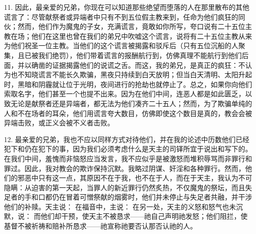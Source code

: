 11. 因此，最亲爱的兄弟，你现在可以知道那些绝望而堕落的人在那里散布的其他谎言了：尽管献祭者或异端者中只有不到五位假主教来到，任命为他们疯狂的同伙；然而，他们作为魔鬼的子女，充满谎言，竟敢如你所写，夸口说有二十五位主教在场；他们在这里也曾在我们的弟兄中吹嘘这个谎言，说将有二十五位主教从来为他们祝圣一位主教。当他们的这个谎言被揭露和驳斥后（只有五位沉船的人聚集，且已被我们绝罚），他们带着谎言的报酬航行到，仿佛真理不能航行到他们后面，并以确凿的证据揭露他们的说谎之舌。而这，我的弟兄，是真正的疯狂：不认为也不知晓谎言不能长久欺骗，黑夜只持续到白天放明；但当白天清明、太阳升起时，黑暗和阴霾就让位于光明，夜间进行的抢劫也就停止了。总之，如果你向他们索取名字，他们甚至一个也提不出来。因为在他们中间，连恶人都是如此匮乏，以致无论是献祭者还是异端者，都无法为他们凑齐二十五人；然而，为了欺骗单纯的人和不在场者的耳朵，他们用谎言夸大数目，仿佛即使这个数目是真的，教会会被异端击败，或正义会被不义者击败。\par

12. 最亲爱的兄弟，我也不应以同样方式对待他们，并在我的论述中历数他们已经犯下和仍在犯下的事，因为我们必须考虑什么是天主的司铎所宜于说出和写下的。在我们中间，羞愧而非恼怒应当发言，我不应似乎是被激怒而堆积辱骂而非罪行和罪过。因此，我对教会的欺诈保持沉默。我略过阴谋、奸淫和各种罪行。然而，他们的邪恶中只有这一点，其原因不在于我，也不在于人，而在于天主，我认为不可隐瞒：从迫害的第一天起，当罪人的新近罪行仍然炙热，不仅魔鬼的祭坛，而且失足者的手和口都仍在冒着可憎祭献的烟雾时，他们并未停止与失足者共融，并干涉他们的补赎。天主说：  在福音中，主说：  在另一处，天主的义怒和怒气也未沉默，说：  而他们却干预，使天主不被恳求——祂自己声明祂发怒；他们阻拦，使基督不被祈祷和赔补所恳求——祂宣称祂要否认那否认祂的人。\par

